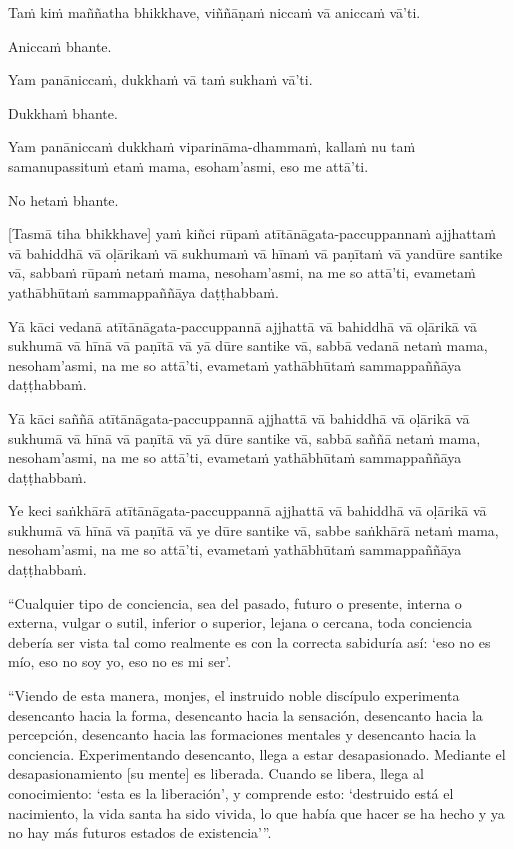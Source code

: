 \clearpage

\paliText
\markboth{\paliTitle}{\rightmark}

Taṁ kiṁ maññatha bhikkhave, viññāṇaṁ niccaṁ vā aniccaṁ vā'ti.

Aniccaṁ bhante.

Yam panāniccaṁ, dukkhaṁ vā taṁ sukhaṁ vā'ti.

Dukkhaṁ bhante.

Yam panāniccaṁ dukkhaṁ viparināma-dhammaṁ, kallaṁ nu taṁ samanupassituṁ
etaṁ mama, esoham'asmi, eso me attā'ti.

No hetaṁ bhante.

[Tasmā tiha bhikkhave] yaṁ kiñci rūpaṁ atītānāgata-paccuppannaṁ ajjhattaṁ
vā bahiddhā vā oḷārikaṁ vā sukhumaṁ vā hīnaṁ vā paṇītaṁ vā yandūre
santike vā, sabbaṁ rūpaṁ netaṁ mama, nesoham'asmi, na me so attā'ti,
evametaṁ yathābhūtaṁ sammappaññāya daṭṭhabbaṁ.

Yā kāci vedanā atītānāgata-paccuppannā ajjhattā vā bahiddhā vā oḷārikā
vā sukhumā vā hīnā vā paṇītā vā yā dūre santike vā, sabbā vedanā netaṁ
mama, nesoham'asmi, na me so attā'ti, evametaṁ yathābhūtaṁ sammappaññāya
daṭṭhabbaṁ.

Yā kāci saññā atītānāgata-paccuppannā ajjhattā vā bahiddhā vā oḷārikā vā
sukhumā vā hīnā vā paṇītā vā yā dūre santike vā, sabbā saññā netaṁ mama,
nesoham'asmi, na me so attā'ti, evametaṁ yathābhūtaṁ sammappaññāya
daṭṭhabbaṁ.

Ye keci saṅkhārā atītānāgata-paccuppannā ajjhattā vā bahiddhā vā oḷārikā
vā sukhumā vā hīnā vā paṇītā vā ye dūre santike vā, sabbe saṅkhārā netaṁ
mama, nesoham'asmi, na me so attā'ti, evametaṁ yathābhūtaṁ sammappaññāya
daṭṭhabbaṁ.

\clearpage

\englishText
\markboth{\englishTitle}{\rightmark}

“Cualquier tipo de conciencia, sea del pasado, futuro o presente, interna o externa, vulgar o sutil, inferior o superior, lejana o cercana, toda conciencia debería ser vista tal como realmente es con la correcta sabiduría así: ‘eso no es mío, eso no soy yo, eso no es mi ser’.

“Viendo de esta manera, monjes, el instruido noble discípulo experimenta desencanto hacia la forma, desencanto hacia la sensación, desencanto hacia la percepción, desencanto hacia las formaciones mentales y desencanto hacia la conciencia. Experimentando desencanto, llega a estar desapasionado. Mediante el desapasionamiento [su mente] es liberada. Cuando se libera, llega al conocimiento: ‘esta es la liberación’, y comprende esto: ‘destruido está el nacimiento, la vida santa ha sido vivida, lo que había que hacer se ha hecho y ya no hay más futuros estados de existencia’”.

